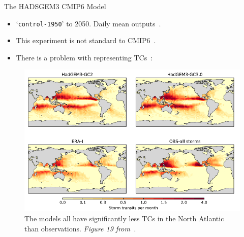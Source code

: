 \documentclass[usenames, dvipsnames]{beamer}
\begin{document}
\begin{frame}{The HADSGEM3 CMIP6 Model~\cite{williams2018met, FurtherInfo}}
\vspace{-20pt}
\begin{itemize}
\item `\texttt{control-1950}' to 2050. Daily mean outputs~\cite{williams2018met, FurtherInfo}.
\item This experiment is not standard to CMIP6~\cite{eyring2016overview}.
\item There is a problem with representing TCs~\cite{tomassini2017interaction}:

\end{itemize}
\begin{figure}
        \includegraphics[width=0.7\linewidth]{images/HAD-TC.png}
            \caption{The models all have
            significantly less TCs in the North Atlantic
             than observations.
             \textit{Figure 19 from~\cite{williams2018met}.} }

\end{figure}
\end{frame}
\end{document}
